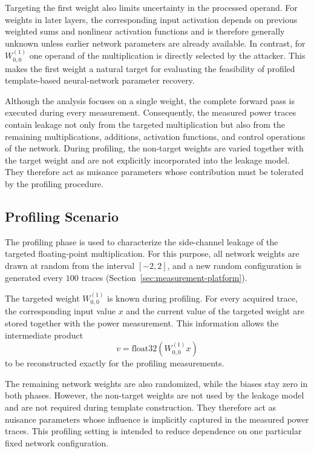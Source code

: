 \documentclass[conference]{IEEEtran}
\begin{document}
Targeting the first weight also limits uncertainty in the processed operand.
For weights in later layers, the corresponding input activation depends on previous weighted sums and nonlinear activation functions and is therefore generally unknown unless earlier network parameters are already available.
In contrast, for $W^{(1)}_{0,0}$ one operand of the multiplication is directly selected by the attacker.
This makes the first weight a natural target for evaluating the feasibility of profiled template-based neural-network parameter recovery.

Although the analysis focuses on a single weight, the complete forward pass is executed during every measurement.
Consequently, the measured power traces contain leakage not only from the targeted multiplication but also from the remaining multiplications, additions, activation functions, and control operations of the network.
During profiling, the non-target weights are varied together with the target weight and are not explicitly incorporated into the leakage model.
They therefore act as nuisance parameters whose contribution must be tolerated by the profiling procedure.

\subsection{Profiling Scenario}
\label{sec:profiling-scenario}

The profiling phase is used to characterize the side-channel leakage of the targeted floating-point multiplication.
For this purpose, all network weights are drawn at random from the interval $[-2,2]$, and a new random configuration is generated every $100$ traces (Section~\ref{sec:measurement-platform}).

The targeted weight $W^{(1)}_{0,0}$ is known during profiling.
For every acquired trace, the corresponding input value $x$ and the current value of the targeted weight are stored together with the power measurement.
This information allows the intermediate product
\begin{equation*}
	v = \mathrm{float32}(W^{(1)}_{0,0} x)
\end{equation*}
to be reconstructed exactly for the profiling measurements.

The remaining network weights are also randomized, while the biases stay zero in both phases.
However, the non-target weights are not used by the leakage model and are not required during template construction.
They therefore act as nuisance parameters whose influence is implicitly captured in the measured power traces.
This profiling setting is intended to reduce dependence on one particular fixed network configuration.
\end{document}
